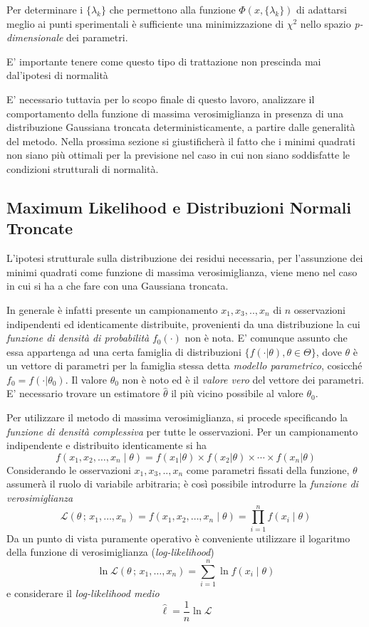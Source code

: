 \documentclass[a4paper]{report}
\begin{document}
Per determinare i $\{\lambda_k\}$ che permettono alla funzione $\Phi(x,\{\lambda_k\})$ di adattarsi meglio ai punti sperimentali è sufficiente una minimizzazione di $\chi^2$ nello spazio \textit{p-dimensionale} dei parametri.

E' importante tenere come questo tipo di trattazione non prescinda mai dal'ipotesi di normalità

E' necessario tuttavia per lo scopo finale di questo lavoro, analizzare il comportamento della funzione di massima verosimiglianza in presenza di una distribuzione Gaussiana troncata deterministicamente, a partire dalle generalità del metodo. 
Nella prossima sezione si giustificherà il fatto che i minimi quadrati non siano più ottimali per la previsione nel caso in cui non siano soddisfatte le condizioni strutturali di normalità.

\subsection{Maximum Likelihood e Distribuzioni Normali Troncate}
L'ipotesi strutturale sulla distribuzione dei residui necessaria, per l'assunzione dei minimi quadrati come funzione di massima verosimiglianza, viene meno nel caso in cui si ha a che fare con una Gaussiana troncata.

In generale è infatti presente un campionamento $x_1,x_3,..,x_n$ di $n$ osservazioni indipendenti ed identicamente distribuite, provenienti da una distribuzione la cui \textit{funzione di densità di probabilità }  $f_0(\cdot)$ non è nota. 
E' comunque assunto che essa appartenga ad una certa famiglia di distribuzioni $ \{f(\cdot |\theta),\theta\in\Theta\} $, dove $\theta$ è un vettore di parametri per la famiglia stessa detta \textit{modello parametrico}, cosicché $f_0=f(\cdot |\theta_0)$. 
Il valore $\theta_0$ non è noto ed è il \textit{valore vero} del vettore dei parametri.
E' necessario trovare un estimatore $\hat{\theta}$ il più vicino possibile al valore $\theta_0$. 

Per utilizzare il metodo di massima verosimiglianza, si procede specificando la \textit{funzione di densità complessiva} per tutte le osservazioni.
Per un campionamento indipendente e distribuito identicamente si ha
\[ f(x_1,x_2,\ldots,x_n\mid\theta) = f(x_1|\theta)\times f(x_2|\theta) \times \cdots \times  f(x_n|\theta)\]
Considerando le osservazioni $x_1,x_3,..,x_n$ come parametri fissati della funzione, $\theta$ assumerà il ruolo di variabile arbitraria; è così possibile introdurre la \textit{funzione di verosimiglianza}
\[ \mathcal{L}(\theta\,;\,x_1,\ldots,x_n) = f(x_1,x_2,\ldots,x_n\mid\theta) = \prod_{i=1}^n f(x_i\mid\theta)\]
Da un punto di vista puramente operativo è conveniente utilizzare il logaritmo della funzione di verosimiglianza (\textit{log-likelihood})
 \[\ln\mathcal{L}(\theta\,;\,x_1,\ldots,x_n) = \sum_{i=1}^n \ln f(x_i\mid\theta)\]
e considerare il \textit{log-likelihood medio}
\[\hat\ell = \frac1n \ln\mathcal{L}\]
\end{document}
